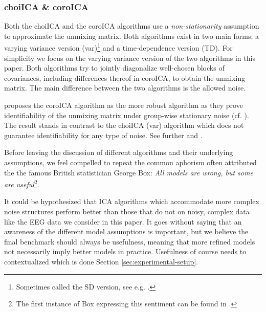 	\subsubsection{choiICA \& coroICA} Both the choiICA and the coroICA algorithms use a \textit{non-stationarity} assumption to approximate the unmixing matrix. Both algorithms exist in two main forms; a varying variance version (var)\footnote{Sometimes called the SD version, see e.g. \cite{nordhausen2014}.} and a time-dependence version (TD). For simplicity we focus on the varying variance version of the two algorithms in this paper. Both algorithms try to jointly diagonalize well-chosen blocks of covariances, including differences thereof in coroICA, to obtain the unmixing matrix. The main difference between the two algorithms is the allowed noise. 

	\cite{pfister2019} proposes the coroICA algorithm as the more robust algorithm as they prove identifiability of the unmixing matrix under group-wise stationary noise (cf. \cite[p.8]{pfister2019}). The result stands in contrast to the choiICA (var) algorithm which does not guarantee identifiability for any type of noise. See further \cite{choi2000a,choi2000b} and \cite{pfister2019}.

	Before leaving the discussion of different algorithms and their underlying assumptions, we feel compelled to repeat the common aphorism often attributed the the famous British statistician George Box: \textit{All models are wrong, but some are useful}\footnote{The first instance of Box expressing this sentiment can be found in \cite{box1976}.}. 

	It could be hypothesized that ICA algorithms which accommodate more complex noise structures perform better than those that do not on noisy, complex data like the EEG data we consider in this paper. It goes without saying that an awareness of the different model assumptions is important, but we believe the final benchmark should always be usefulness, meaning that more refined models not necessarily imply better models in practice. Usefulness of course needs to contextualized which is done Section \ref{sec:experimental-setup}.




